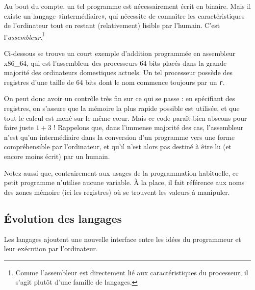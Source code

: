 Au bout du compte, un tel programme est nécessairement écrit en binaire. Mais il existe un langage «intermédiaire», qui nécessite de connaître les caractéristiques de l'ordinateur tout en restant (relativement) lisible par l'humain. C'est l'\emph{assembleur}.\footnote{Comme l'assembleur est directement lié aux caractéristiques du processeur, il s'agit plutôt d'une famille de langages.}

Ci-dessous se trouve un court exemple d'addition programmée en assembleur x86\_64, qui est l'assembleur des processeurs 64 bits placés dans la grande majorité des ordinateurs domestiques actuels. Un tel processeur possède des registres d'une taille de 64 bits dont le nom commence toujours par un \texttt{r}.

On peut donc avoir un contrôle très fin sur ce qui se passe : en spécifiant des registres, on s'assure que la mémoire la plus rapide possible est utilisée, et que tout le calcul est mené sur le même cœur. Mais ce code paraît bien abscons pour faire juste $1+3$ ! Rappelons que, dans l'immense majorité des cas, l'assembleur n'est qu'un intermédiaire dans la conversion d'un programme vers une forme compréhensible par l'ordinateur, et qu'il n'est alors pas destiné à être lu (et encore moins écrit) par un humain.

Notez aussi que, contrairement aux usages de la programmation habituelle, ce petit programme n'utilise aucune variable. À la place, il fait référence aux noms des zones mémoire (ici les registres) où se trouvent les valeurs à manipuler.

\lstset{language=[x86masm]Assembler}\label{prog:asm}

\subsection{Évolution des langages}
Les langages ajoutent une nouvelle interface entre les idées du programmeur et leur exécution par l'ordinateur.

